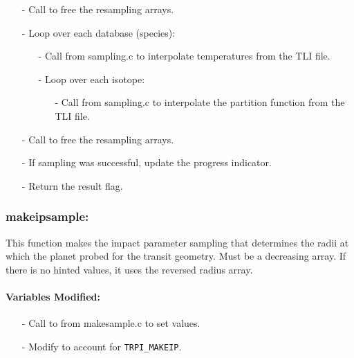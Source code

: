 \documentclass[letterpaper,12pt]{article}
\begin{document}
\begin{itemize}[leftmargin=10pt, noitemsep, parsep=0pt, topsep=0ex]
\item[-] Call   to free the resampling arrays.
\item[-] Loop over each database (species):
\begin{itemize}[leftmargin=10pt, noitemsep, parsep=0pt, topsep=0ex]
\item[-] Call  from sampling.c to interpolate temperatures from the TLI file.
\item[-] Loop over each isotope:
\begin{itemize}[leftmargin=10pt, noitemsep, parsep=0pt, topsep=0ex]
\item[-] Call  from sampling.c to interpolate the partition function from the TLI file.
\end{itemize}
\end{itemize}
\item[-] Call   to free the resampling arrays.
\item[-] If sampling was successful, update the progress indicator.
\item[-] Return the result flag.
\end{itemize}


\subsubsection{makeipsample:}
This function makes the impact parameter sampling that determines the
radii at which the planet probed for the transit geometry.  Must be a
decreasing array. If there is no hinted values, it uses the reversed
radius array.
\paragraph{Variables Modified:}
\begin{enumerate}[leftmargin=10pt, noitemsep, parsep=0pt, topsep=0ex]
\item[-] Call to  from makesample.c to set  values.
\item[-] Modify  to account for {\tt TRPI\_MAKEIP}.
\end{enumerate}
\end{document}
